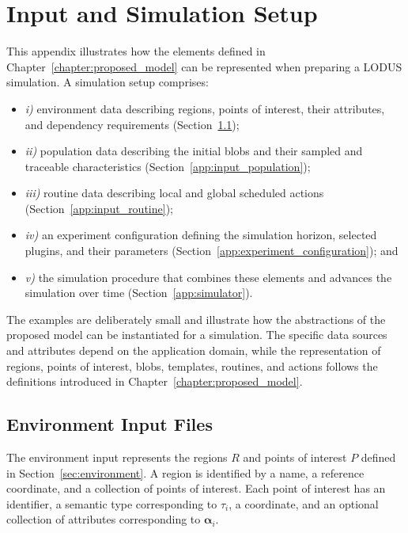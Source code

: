 \chapter{Input and Simulation Setup}
\label{app:input}

This appendix illustrates how the elements defined in Chapter~\ref{chapter:proposed_model} can be represented when preparing a LODUS simulation. A simulation setup comprises: 
\begin{itemize} 
    \item \textit{i)} environment data describing regions, points of interest, their attributes, and dependency requirements (Section~\ref{app:input_environment}); 
    \item \textit{ii)} population data describing the initial blobs and their sampled and traceable characteristics (Section~\ref{app:input_population}); 
    \item \textit{iii)} routine data describing local and global scheduled actions (Section~\ref{app:input_routine}); 
    \item \textit{iv)} an experiment configuration defining the simulation horizon, selected plugins, and their parameters (Section~\ref{app:experiment_configuration}); and 
    \item \textit{v)} the simulation procedure that combines these elements and advances the simulation over time (Section~\ref{app:simulator}). 
\end{itemize} 

The examples are deliberately small and illustrate how the abstractions of the proposed model can be instantiated for a simulation. The specific data sources and attributes depend on the application domain, while the representation of regions, points of interest, blobs, templates, routines, and actions follows the definitions introduced in Chapter~\ref{chapter:proposed_model}.


\section{Environment Input Files}
\label{app:input_environment}

The environment input represents the regions $R$ and points of interest $P$ defined in Section~\ref{sec:environment}. A region is identified by a name, a reference coordinate, and a collection of points of interest. Each point of interest has an identifier, a semantic type corresponding to $\tau_i$, a coordinate, and an optional collection of attributes corresponding to $\bm{\alpha}_i$.

